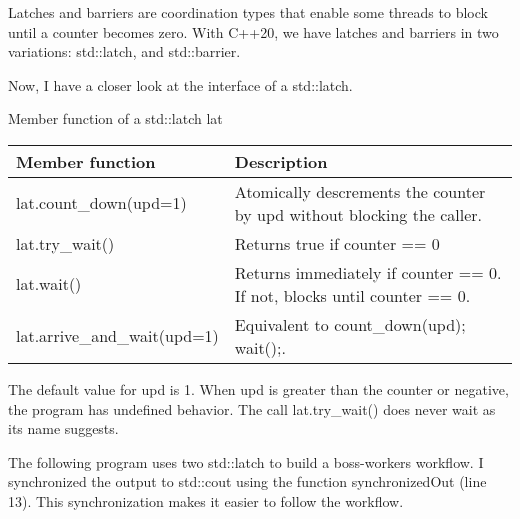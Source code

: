 Latches and barriers are coordination types that enable some threads to block until a counter becomes zero. With C++20, we have latches and barriers in two variations: std::latch, and std::barrier.


Now, I have a closer look at the interface of a std::latch.

\begin{center}
Member function of a std::latch lat
\end{center}

\begin{longtable}[c]{|l|l|}
\hline
\textbf{Member function} & \textbf{Description}         \\ \hline
\endfirsthead
%
\endhead
%
lat.count\_down(upd=1)       & Atomically descrements the counter by upd without blocking the caller.  \\ \hline
lat.try\_wait()          & Returns true if counter == 0 \\ \hline
lat.wait()                   & Returns immediately if counter == 0. If not, blocks until counter == 0. \\ \hline
lat.arrive\_and\_wait(upd=1) & Equivalent to count\_down(upd); wait();.                                \\ \hline
\end{longtable}


The default value for upd is 1. When upd is greater than the counter or negative, the program has undefined behavior. The call lat.try\_wait() does never wait as its name suggests.

The following program uses two std::latch to build a boss-workers workflow. I synchronized the output to std::cout using the function synchronizedOut (line 13). This synchronization makes it easier to follow the workflow.


